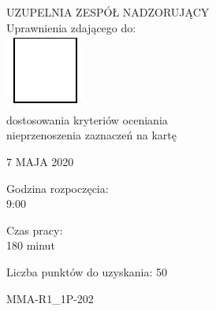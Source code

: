 \documentclass[10pt]{article}
\begin{document}
UZUPELNIA ZESPÓŁ NADZORUJĄCY\\
Uprawnienia zdającego do:\\
\includegraphics[max width=\textwidth, center]{2024_11_21_ebf83f11df6f4915f701g-01(1)}\\
dostosowania kryteriów oceniania\\
nieprzenoszenia zaznaczeń na kartę

7 MAJA 2020

Godzina rozpoczęcia:\\
9:00

Czas pracy:\\
180 minut

Liczba punktów do uzyskania: 50

MMA-R1\_1P-202
\end{document}
